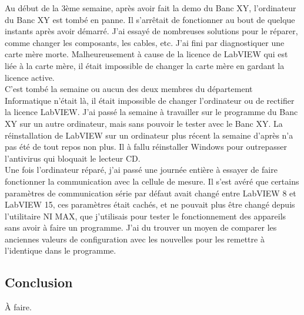 \documentclass[12pt]{article}
\begin{document}
Au début de la 3ème semaine, après avoir fait la demo du Banc XY, l'ordinateur du Banc XY est tombé en panne.
Il s'arrêtait de fonctionner au bout de quelque instants après avoir démarré.
J'ai essayé de nombreuses solutions pour le réparer, comme changer les composants, les cables, etc.
J'ai fini par diagnostiquer une carte mère morte.
Malheureusement à cause de la licence de LabVIEW qui est liée à la carte mère, il était impossible de changer la carte mère en gardant la licence active.\\
C'est tombé la semaine ou aucun des deux membres du département Informatique n'était là, il était impossible de changer l'ordinateur ou de rectifier la licence LabVIEW.
J'ai passé la semaine à travailler sur le programme du Banc XY sur un autre ordinateur, mais sans pouvoir le tester avec le Banc XY.
La réinstallation de LabVIEW sur un ordinateur plus récent la semaine d'après n'a pas été de tout repos non plus.
Il à fallu réinstaller Windows pour outrepasser l'antivirus qui bloquait le lecteur CD.\\
Une fois l'ordinateur réparé, j'ai passé une journée entière à essayer de faire fonctionner la communication avec la cellule de mesure.
Il s'est avéré que certains paramètres de communication série par défaut avait changé entre LabVIEW 8 et LabVIEW 15, ces paramètres était cachés, et ne pouvait plus être changé depuis l'utilitaire NI MAX, que j'utilisais pour tester le fonctionnement des appareils sans avoir à faire un programme.
J'ai du trouver un moyen de comparer les anciennes valeurs de configuration avec les nouvelles pour les remettre à l'identique dans le programme.


\newpage
\subsection{ Conclusion }

À faire.



\newpage

\printglossaries[title=Glossaire,toctitle=Glossaire]
\end{document}
